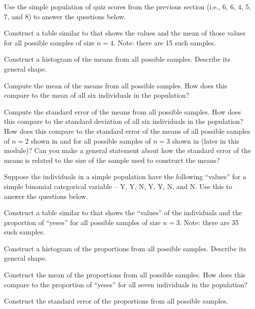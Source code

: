 \documentclass[10pt,openany]{book}\usepackage[]{graphicx}\usepackage[]{color}
\begin{document}
\begin{exsection}
  \item \label{revex:SamplingDistn3} Use the simple population of quiz scores from the previous section (i.e., 6, 6, 4, 5, 7, and 8) to answer the questions below. 
    \begin{Enumerate}
      \item Construct a table similar to  that shows the values and the mean of those values for all possible samples of size $n=4$.  Note: there are 15 such samples.
      \item Construct a histogram of the means from all possible samples.  Describe its general shape.
      \item Compute the mean of the means from all possible samples.  How does this compare to the mean of all six individuals in the population?
      \item Compute the standard error of the means from all possible samples.  How does this compare to the standard deviation of all six individuals in the population?  How does this compare to the standard error of the means of all possible samples of $n=2$ shown in  and for all possible samples of $n=3$ shown in  (later in this module)?  Can you make a general statement about how the standard error of the means is related to the size of the sample used to construct the means?
    \end{Enumerate}

  \item \label{revex:SamplingDistp2} Suppose the individuals in a simple population have the following ``values'' for a simple binomial categorical variable -- Y, Y, N, Y, Y, N, and N.  Use this to answer the questions below. 
    \begin{Enumerate}
      \item Construct a table similar to  that shows the ``values'' of the individuals and the proportion of ``yeses'' for all possible samples of size $n=3$.  Note: there are 35 such samples.
      \item Construct a histogram of the proportions from all possible samples.  Describe its general shape.
      \item Construct the mean of the proportions from all possible samples.  How does this compare to the proportion of ``yeses'' for all seven individuals in the population?
      \item Construct the standard error of the proportions from all possible samples.
    \end{Enumerate}
\end{exsection}
\end{document}
